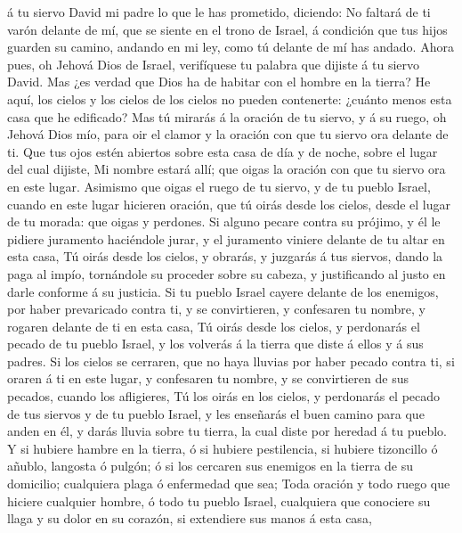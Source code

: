 á tu siervo David mi padre lo que le has prometido, diciendo: No faltará
de ti varón delante de mí, que se siente en el trono de Israel, á
condición que tus hijos guarden su camino, andando en mi ley, como tú
delante de mí has andado.  Ahora pues, oh Jehová Dios de
Israel, verifíquese tu palabra que dijiste á tu siervo David.
 Mas ¿es verdad que Dios ha de habitar con el hombre en la
tierra? He aquí, los cielos y los cielos de los cielos no pueden
contenerte: ¿cuánto menos esta casa que he edificado?  Mas
tú mirarás á la oración de tu siervo, y á su ruego, oh Jehová Dios mío,
para oir el clamor y la oración con que tu siervo ora delante de ti.
 Que tus ojos estén abiertos sobre esta casa de día y de
noche, sobre el lugar del cual dijiste, Mi nombre estará allí; que oigas
la oración con que tu siervo ora en este lugar.  Asimismo
que oigas el ruego de tu siervo, y de tu pueblo Israel, cuando en este
lugar hicieren oración, que tú oirás desde los cielos, desde el lugar de
tu morada: que oigas y perdones.  Si alguno pecare contra
su prójimo, y él le pidiere juramento haciéndole jurar, y el juramento
viniere delante de tu altar en esta casa,  Tú oirás desde
los cielos, y obrarás, y juzgarás á tus siervos, dando la paga al impío,
tornándole su proceder sobre su cabeza, y justificando al justo en darle
conforme á su justicia.  Si tu pueblo Israel cayere delante
de los enemigos, por haber prevaricado contra ti, y se convirtieren, y
confesaren tu nombre, y rogaren delante de ti en esta casa,
 Tú oirás desde los cielos, y perdonarás el pecado de tu
pueblo Israel, y los volverás á la tierra que diste á ellos y á sus
padres.  Si los cielos se cerraren, que no haya lluvias por
haber pecado contra ti, si oraren á ti en este lugar, y confesaren tu
nombre, y se convirtieren de sus pecados, cuando los afligieres,
 Tú los oirás en los cielos, y perdonarás el pecado de tus
siervos y de tu pueblo Israel, y les enseñarás el buen camino para que
anden en él, y darás lluvia sobre tu tierra, la cual diste por heredad á
tu pueblo.  Y si hubiere hambre en la tierra, ó si hubiere
pestilencia, si hubiere tizoncillo ó añublo, langosta ó pulgón; ó si los
cercaren sus enemigos en la tierra de su domicilio; cualquiera plaga ó
enfermedad que sea;  Toda oración y todo ruego que hiciere
cualquier hombre, ó todo tu pueblo Israel, cualquiera que conociere su
llaga y su dolor en su corazón, si extendiere sus manos á esta casa,
